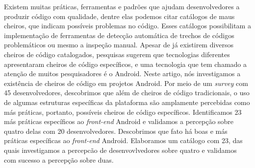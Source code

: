 Existem muitas práticas, ferramentas e padrões que ajudam desenvolvedores a produzir código com qualidade, dentre elas podemos citar catálogos de maus cheiros, que indicam possíveis problemas no código. Esses catálogos possibilitam a implementação de ferramentas de detecção automática de trechos de códigos problemáticos ou mesmo a inspeção manual. Apesar de já existirem diversos cheiros de código catalogados, pesquisas sugerem que tecnologias diferentes apresentaram cheiros de código específicos, e uma tecnologia que tem chamado a atenção de muitos pesquisadores é o Android. Neste artigo, nós investigamos a existência de cheiros de código em projetos Android. Por meio de um \textit{survey} com 45 desenvolvedores, descobrimos que além de cheiros de código tradicionais, o uso de algumas estruturas específicas da plataforma são amplamente percebidas como más práticas, portanto, possíveis cheiros de código específicos. Identificamos 23 más práticas específicos ao \textit{front-end} Android e validamos a percepção sobre quatro delas com 20 desenvolvedores. Descobrimos que fato há boas e más práticas específicas ao \textit{front-end} Android. Elaboramos um catálogo com 23, das quais investigamos a percepcão de desenvovlvedores sobre quatro e validamos com sucesso a percepção sobre duas.


